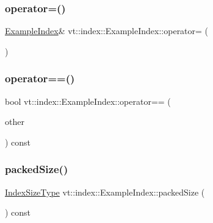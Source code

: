 \mbox{\label{structvt_1_1index_1_1_example_index_acaf68d730667b378a377bb2eabc53203}} 
\subsubsection{\texorpdfstring{operator=()}{operator=()}}
{\footnotesize\ttfamily \hyperlink{structvt_1_1index_1_1_example_index}{Example\+Index}\& vt\+::index\+::\+Example\+Index\+::operator= (\begin{DoxyParamCaption}\item[{\hyperlink{structvt_1_1index_1_1_example_index}{Example\+Index} const \&}]{ }\end{DoxyParamCaption})\hspace{0.3cm}{\ttfamily [default]}}

\mbox{\label{structvt_1_1index_1_1_example_index_ab473f0e55b054b4db5226b376357b5b1}} 
\subsubsection{\texorpdfstring{operator==()}{operator==()}}
{\footnotesize\ttfamily bool vt\+::index\+::\+Example\+Index\+::operator== (\begin{DoxyParamCaption}\item[{\hyperlink{structvt_1_1index_1_1_example_index}{Example\+Index} const \&}]{other }\end{DoxyParamCaption}) const}

\mbox{\label{structvt_1_1index_1_1_example_index_a29fc62c72007ce1e4beae6e5109ea567}} 
\subsubsection{\texorpdfstring{packed\+Size()}{packedSize()}}
{\footnotesize\ttfamily \hyperlink{structvt_1_1index_1_1_example_index_a19740d27aa6a911ec99a6f19f8cfdaab}{Index\+Size\+Type} vt\+::index\+::\+Example\+Index\+::packed\+Size (\begin{DoxyParamCaption}{ }\end{DoxyParamCaption}) const}

